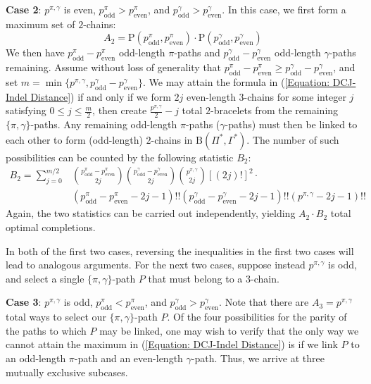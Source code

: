 {\bf Case 2}: $p^{\pi, \gamma}$ is even, $p^\pi_{\mathrm{odd}} > p^\pi_{\mathrm{even}}$, and $p^\gamma_{\mathrm{odd}} > p^\gamma_{\mathrm{even}}$. In this case, we first form a maximum set of $2$-chains:
\begin{equation}
A_2 = \mathrm{P}\left(p^\pi_{\mathrm{odd}}, p^\pi_{\mathrm{even}}\right) \cdot \mathrm{P}\left(p^\gamma_{\mathrm{odd}}, p^\gamma_{\mathrm{even}}\right)
\end{equation}
We then have $p^\pi_{\mathrm{odd}} - p^\pi_{\mathrm{even}}$ odd-length $\pi$-paths and $p^\gamma_{\mathrm{odd}} - p^\gamma_{\mathrm{even}}$ odd-length $\gamma$-paths remaining.   Assume without loss of generality that $p^\pi_{\mathrm{odd}} - p^\pi_{\mathrm{even}} \geq p^\gamma_{\mathrm{odd}} - p^\gamma_{\mathrm{even}}$, and set $m = \min{\{p^{\pi, \gamma}, p^\gamma_{\mathrm{odd}} - p^{\gamma}_{\mathrm{even}}\}}$.  We may attain the formula in (\ref{Equation: DCJ-Indel Distance}) if and only if we form $2j$ even-length $3$-chains for some integer $j$ satisfying $0 \leq j \leq \frac{m}{2}$, then create $\frac{p^{\pi, \gamma}}{2} - j$ total $2$-bracelets from the remaining $\{\pi, \gamma\}$-paths.  Any remaining odd-length $\pi$-paths ($\gamma$-paths) must then be linked to each other to form (odd-length) $2$-chains in $\mathrm{B}(\Pi^*, \Gamma^*)$.   The number of such possibilities can be counted by the following statistic $B_2$:
\begin{align}
B_2 = \sum_{j=0}^{m/2}&{\binom{p^\pi_{\mathrm{odd}} - p^\pi_{\mathrm{even}}}{2j} \binom{p^\gamma_{\mathrm{odd}} - p^\gamma_{\mathrm{even}}}{2j} \binom{p^{\pi, \gamma}}{2j} \left[\left(2j\right)!\right]^2} \cdot \nonumber \\
& \left( p^\pi_{\mathrm{odd}} - p^\pi_{\mathrm{even}} - 2j - 1 \right)!! \left( p^\gamma_{\mathrm{odd}} - p^\gamma_{\mathrm{even}} - 2j - 1\right)!! \left( p^{\pi, \gamma} - 2j - 1 \right)!!
\end{align}
Again, the two statistics can be carried out independently, yielding $A_2 \cdot B_2$ total optimal completions.

In both of the first two cases, reversing the inequalities in the first two cases will lead to analogous arguments.  For the next two cases, suppose instead $p^{\pi, \gamma}$ is odd, and select a single $\{\pi, \gamma\}$-path $P$ that must belong to a $3$-chain.

{\bf Case 3}: $p^{\pi, \gamma}$ is odd, $p^\pi_{\mathrm{odd}} < p^\pi_{\mathrm{even}}$, and $p^\gamma_{\mathrm{odd}} > p^\gamma_{\mathrm{even}}$.  Note that there are $A_3 = p^{\pi, \gamma}$ total ways to select our $\{\pi, \gamma\}$-path $P$.  Of the four possibilities for the parity of the paths to which $P$ may be linked, one may wish to verify that the only way we cannot attain the maximum in (\ref{Equation: DCJ-Indel Distance}) is if we link $P$ to an odd-length $\pi$-path and an even-length $\gamma$-path.  Thus, we arrive at three mutually exclusive subcases.

